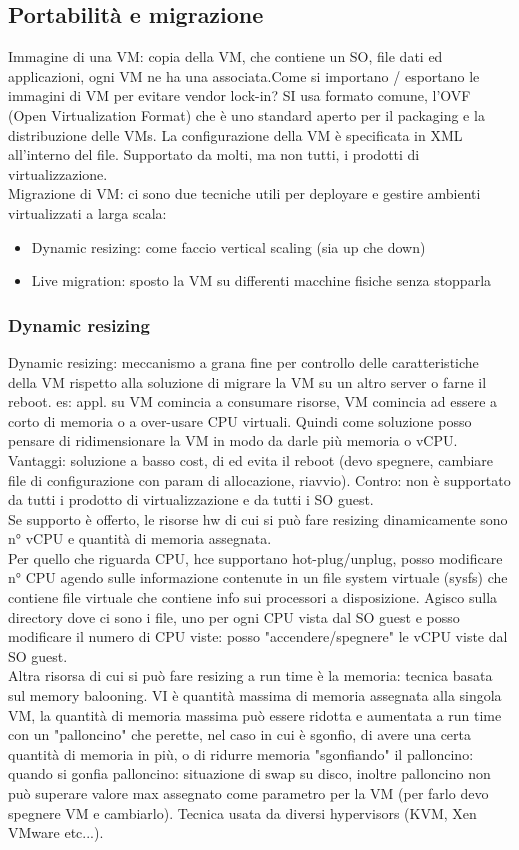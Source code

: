 \documentclass[16px]{article}
\begin{document}
\subsection{Portabilità e migrazione}
Immagine di una VM: copia della VM, che contiene un SO, file dati ed applicazioni, ogni VM ne ha una associata.Come si importano / esportano le immagini di VM per evitare vendor lock-in? SI usa formato comune, l'OVF (Open Virtualization Format) che è uno standard aperto per il packaging e la distribuzione delle VMs. La configurazione della VM è specificata in XML all'interno del file. Supportato da molti, ma non tutti, i prodotti di virtualizzazione.\\ Migrazione di VM: ci sono due tecniche utili per deployare e gestire ambienti virtualizzati a larga scala:
\begin{itemize}
\item Dynamic resizing: come faccio vertical scaling (sia up che down)
\item Live migration: sposto la VM su differenti macchine fisiche senza stopparla
\end{itemize}
\subsubsection{Dynamic resizing}
Dynamic resizing: meccanismo a grana fine per controllo delle caratteristiche della VM rispetto alla soluzione di migrare la VM su un altro server o farne il reboot. es: appl. su VM comincia a consumare risorse, VM comincia ad essere a corto di memoria o a over-usare CPU virtuali. Quindi come soluzione posso pensare di ridimensionare la VM in  modo da darle più memoria o vCPU.\\ Vantaggi: soluzione a basso cost, di ed evita il reboot (devo spegnere, cambiare file di configurazione con param di allocazione, riavvio). Contro: non è supportato da tutti i prodotto di virtualizzazione e da tutti i SO guest.\\ Se supporto è offerto, le risorse hw di cui si può fare resizing dinamicamente sono n° vCPU e quantità di memoria assegnata.\\ Per quello che riguarda CPU, hce supportano hot-plug/unplug, posso modificare n° CPU agendo sulle informazione contenute in un file system virtuale (sysfs) che contiene file virtuale che contiene info sui processori a disposizione. Agisco sulla directory dove ci sono i file, uno per ogni CPU vista dal SO guest e posso modificare il numero di CPU viste: posso "accendere/spegnere" le vCPU viste dal SO guest.\\ Altra risorsa di cui si può fare resizing a run time è la memoria: tecnica basata sul memory balooning. VI è quantità massima di memoria assegnata alla singola VM, la quantità di memoria massima può essere ridotta e aumentata a run time con un "palloncino" che perette, nel caso in cui è sgonfio, di avere una certa quantità di memoria in più, o di ridurre memoria "sgonfiando" il palloncino: quando si gonfia palloncino: situazione di swap su disco, inoltre palloncino non può superare valore max assegnato come parametro per la VM (per farlo devo spegnere VM e cambiarlo). Tecnica usata da diversi hypervisors (KVM, Xen VMware etc...).
\end{document}
